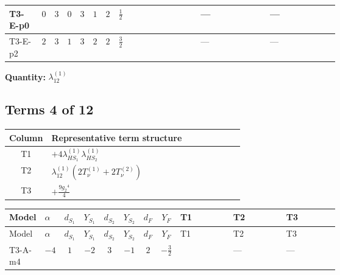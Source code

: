 \documentclass[8pt]{article}
\begin{document}
\begin{landscape}
\begin{longtable}{@{}llcccccc >{\raggedright\arraybackslash}p{0.21\linewidth} >{\raggedright\arraybackslash}p{0.21\linewidth} >{\raggedright\arraybackslash}p{0.21\linewidth}@{}}
\midrule
T3-E-p0 & $0$ & $3$ & $0$ & $3$ & $1$ & $2$ & $\frac{1}{2}$ & \scriptsize\adjustbox{max width=\linewidth}{$\begin{gathered} +4 {\lambda_{12}^{(1)}}^2\end{gathered}$} & --- & --- \\
\midrule
T3-E-p2 & $2$ & $3$ & $1$ & $3$ & $2$ & $2$ & $\frac{3}{2}$ & \scriptsize\adjustbox{max width=\linewidth}{$\begin{gathered} +4 {\lambda_{12}^{(1)}}^2\end{gathered}$} & --- & --- \\
\midrule
\bottomrule
\end{longtable}
\clearpage
\noindent\textbf{Quantity: }$\lambda_{12}^{(1)}$\par\smallskip
\subsection*{Terms 4 of 12}
\begin{center}
\begin{tabular}{@{}c >{\raggedright\arraybackslash}p{0.82\linewidth}@{}}
\toprule
Column & Representative term structure \\
\midrule
T1 & \(\displaystyle +4 {\lambda_{HS_1}^{(1)}} {\lambda_{HS_2}^{(1)}}\) \\
\midrule
T2 & \(\displaystyle {\lambda_{12}^{(1)}} (2 T_{\nu}^{(1)}+2 T_{\nu}^{(2)})\) \\
\midrule
T3 & \(\displaystyle +\frac{9 {g_2}^4}{4}\) \\
\midrule
\bottomrule
\end{tabular}
\end{center}
\smallskip
\tiny
\begin{longtable}{@{}llcccccc >{\raggedright\arraybackslash}p{0.21\linewidth} >{\raggedright\arraybackslash}p{0.21\linewidth} >{\raggedright\arraybackslash}p{0.21\linewidth}@{}}
\toprule
Model & $\alpha$ & $d_{S_1}$ & $Y_{S_1}$ & $d_{S_2}$ & $Y_{S_2}$ & $d_F$ & $Y_F$ & T1 & T2 & T3 \\
\midrule
\endfirsthead
\toprule
Model & $\alpha$ & $d_{S_1}$ & $Y_{S_1}$ & $d_{S_2}$ & $Y_{S_2}$ & $d_F$ & $Y_F$ & T1 & T2 & T3 \\
\midrule
\endhead
T3-A-m4 & $-4$ & $1$ & $-2$ & $3$ & $-1$ & $2$ & $-\frac{3}{2}$ & \scriptsize\adjustbox{max width=\linewidth}{$\begin{gathered} +4 {\lambda_{HS_1}^{(1)}} {\lambda_{HS_2}^{(1)}}\end{gathered}$} & --- & --- \\

\end{longtable}
\end{landscape}
\end{document}
